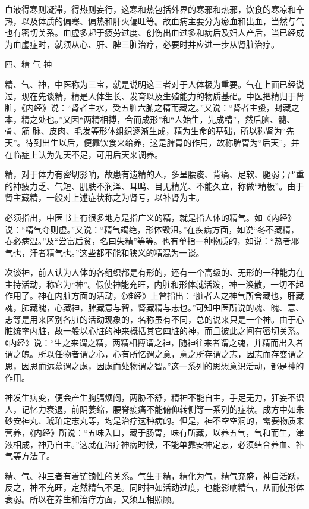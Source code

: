 \documentclass[12pt,UTF8]{ctexbook}
\begin{document}
血液得寒则凝滞，得热则妄行，这寒和热包括外界的寒邪和热邪，饮食的寒凉和辛热，以及体质的偏寒、偏热和肝火偏旺等。故血病主要分为瘀血和出血，当然与气也有密切关系。血虚多起于疲劳过度、创伤出血过多和病后及妇人产后，当已经成为血虚症时，就须从心、肝、脾三脏治疗，必要时并应进一步从肾脏治疗。

四、精 气 神

精、气、神，中医称为三宝，就是说明这三者对于人体极为重要。气在上面已经说过，现在先谈精，精是人体生长、发育以及生殖能力的物质基础。中医把精归于肾脏，《内经》说：“肾者主水，受五脏六腑之精而藏之。”又说：“肾者主蛰，封藏之本，精之处也。”又因“两精相搏，合而成形”和“人始生，先成精”，然后脑、髓、骨、筋 脉、皮肉、毛发等形体组织逐渐生成，精为生命的基础，所以称肾为“先天”。待到出生以后，便靠饮食来给养，这是脾胃的作用，故称脾胃为“后天”，并在临症上认为先天不足，可用后天来调养。

精，对于体力有密切影响，故患有遗精的人，多呈腰痠、背痛、足软、腿弱；严重的神疲力乏、气短、肌肤不润泽、耳鸣、目无精光、不能久立，称做“精极”。由于肾主藏精，一般对上述症状称之为肾亏，以补肾为主。

必须指出，中医书上有很多地方是指广义的精，就是指人体的精气。如《内经》说：“精气夺则虚。”又说：“精气竭绝，形体毁沮。”在疾病方面，如说“冬不藏精，春必病温。”及“尝富后贫，名曰失精”等等。也有单指一种物质的，如说：“热者邪气也，汗者精气也。”这些都不能和狭义的精混为一谈。

次谈神，前人认为人体的各组织都是有形的，还有一个高级的、无形的一种能力在主持活动，称它为“神”。假使神能充旺，内脏和形体就活泼，神一涣散，一切不起作用了。神在内脏方面的活动，《难经》上曾指出：“脏者人之神气所舍藏也，肝藏魂，肺藏魄，心藏神，脾藏意与智，肾藏精与志也。”可知中医所说的魂、魄、意、志等是用来区别各脏的活动现象的，名称虽有不同，总的说来只是一个神。由于心脏统率内脏，故一般以心脏的神来概括其它四脏的神，而且彼此之间有密切关系。《内经》说：“生之来谓之精，两精相搏谓之神，随神往来者谓之魂，并精而出入者谓之魄。所以任物者谓之心，心有所忆谓之意，意之所存谓之志，因志而存变谓之思，因思而远慕谓之虑，因虑而处物谓之智。”这一系列的思想意识活动，都是神的作用。

神发生病变，便会产生胸膈烦闷，两胁不舒，精神不能自主，手足无力，狂妄不识人，记忆力衰退，前阴萎缩，腰脊痠痛不能俯仰转侧等一系列的症状。成方中如朱砂安神丸、琥珀定志丸等，均是治疗这种病的。但是，神不空空洞的，需要物质来营养，《内经》所说：“五味入口，藏于肠胃，味有所藏，以养五气，气和而生，津液相成，神乃自主。”这就在治疗神病时候，不能单靠安神定志，必须结合养血、补气等方法了。

精、气、神三者有着链锁性的关系。气生于精，精化为气，精气充盛，神自活跃，反之，神不充旺，定然精气不足。同时神如活动过度，也能影响精气，从而使形体衰弱。所以在养生和治疗方面，又须互相照顾。
\end{document}
